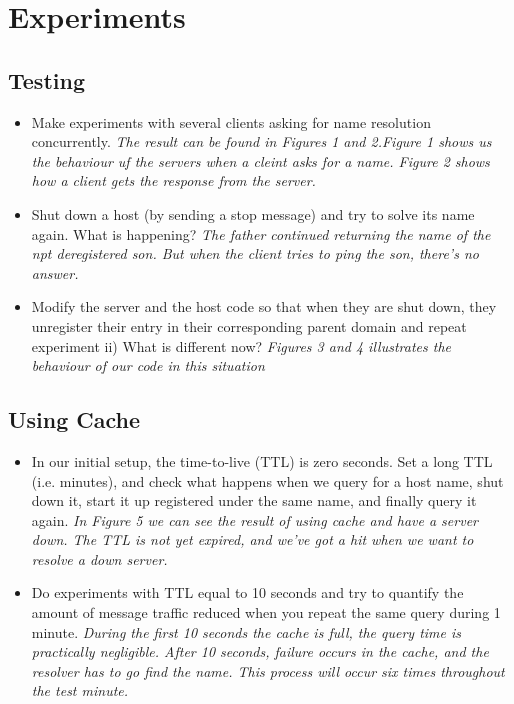 \section{Experiments}

\subsection{Testing}
\begin{itemize}
\item Make experiments with several clients asking for name resolution concurrently.
\newline \textit{The result can be found in Figures 1 and 2.\newline Figure 1 shows us the behaviour uf the servers when a cleint asks for a name. \newline Figure 2 shows how a client gets the response from the server.}

\item Shut down a host (by sending a stop message) and try to solve its name again. \newline What is happening?
\newline\textit{The father continued returning the name of the npt deregistered son. \nreline But when the client tries to ping the son, there's no answer.}

\item Modify the server and the host code so that when they are shut down, they unregister their entry in their corresponding parent domain and repeat experiment ii) \newline What is different now?
\newline\textit{Figures 3 and 4 illustrates the behaviour of our code in this situation}
\end{itemize}

\subsection{Using Cache}
\begin{itemize}
\item In our initial setup, the time-to-live (TTL) is zero seconds.
Set a long TTL (i.e. minutes), and check what happens when we query for a host name, shut down it, start it up registered under the same name, and finally
query it again. 
\newline\textit{In Figure 5 we can see the result of using cache and have a server down. The TTL is not yet expired, and we've got a hit when we want to resolve a down server.}

\item Do experiments with TTL equal to 10 seconds and try to quantify the amount of message traffic reduced when you repeat the same query during 1 minute.
\newline\textit{During the first 10 seconds the cache is full, the query time is practically negligible.
After 10 seconds, failure occurs in the cache, and the resolver has to go find the name. This process will occur six times throughout the test minute.}
\end{itemize}